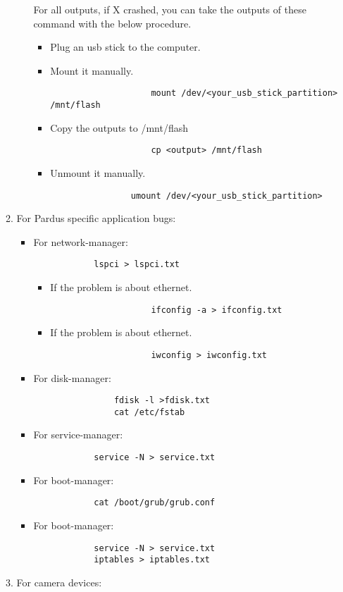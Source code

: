 \documentclass[a4paper,10pt]{article}
\begin{document}
\begin{itemize}
\begin{enumerate}
\begin{itemize}
		For all outputs, if X crashed, you can take the outputs of these command with the below procedure.
		\begin{itemize}
			\item Plug an usb stick to the computer.
			\item Mount it manually.	
				\begin{verbatim}
    				mount /dev/<your_usb_stick_partition> /mnt/flash
				\end{verbatim}
			\item Copy the outputs to /mnt/flash	
				\begin{verbatim}
     				cp <output> /mnt/flash	
				\end{verbatim}
			\item Unmount it manually.
				\begin{verbatim}
  				umount /dev/<your_usb_stick_partition>
				\end{verbatim}
		\end{itemize}
	\end{itemize}
	\item For Pardus specific application bugs:
	\begin{itemize}
		\item For network-manager:
			\begin{verbatim}
			lspci > lspci.txt
			\end{verbatim}
			\begin{itemize}
  			\item If the problem is about ethernet.
				\begin{verbatim}
    				ifconfig -a > ifconfig.txt
				\end{verbatim}
  			\item If the problem is about ethernet.
				\begin{verbatim}
    				iwconfig > iwconfig.txt
				\end{verbatim}
			\end{itemize}
		\item For disk-manager:
			\begin{verbatim}
		    	fdisk -l >fdisk.txt
    			cat /etc/fstab
			\end{verbatim}
		\item For service-manager:
			\begin{verbatim}
			service -N > service.txt
			\end{verbatim}
		\item For boot-manager:
			\begin{verbatim}
			cat /boot/grub/grub.conf
			\end{verbatim}
		\item For boot-manager:
			\begin{verbatim}
			service -N > service.txt
			iptables > iptables.txt
			\end{verbatim}
	\end{itemize}
	\item  For camera devices:
	

\end{enumerate}
\end{itemize}
\end{document}
